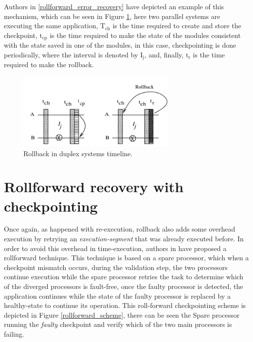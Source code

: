 \documentclass[10pt, a4paper]{report}
\begin{document}
Authors in \ref{rollforward_error_recovery} have depicted an example of this 
mechanism, which can be seen in Figure \ref{rollback_diagram}, here two parallel 
systems are executing the same application, $\mathrm{T_{ch}}$ is the time 
required to create and store the checkpoint, $\mathrm{t_{cp}}$ is the time 
required to make the state of the modules consistent with the state saved in one 
of the modules, in this case, checkpointing is done periodically, where the 
interval is denoted by $\mathrm{I_j}$, and, finally, $\mathrm{t_r}$ is the time 
required to make the rollback.

\begin{figure}[h!]
    \begin{center}
        \includegraphics[width=0.7\textwidth]{rollback_diagram.png}
        \caption{Rollback in duplex systems timeline.}
        \label{rollback_diagram}
    \end{center}
\end{figure}

\section{Rollforward recovery with checkpointing}

Once again, as happened with re-execution, rollback also adds some overhead
execution by retrying an \emph{execution-segment} that was already executed
before. In order to avoid this overhead in time-execution, authors in
\cite{rollforward_error_recovery} have proposed a rollforward technique. This
technique is based on a spare processor, which when a checkpoint mismatch
occurs, during the validation step, the two processors continue execution while
the spare processor retries the task to determine which of the diverged
processors is fault-free, once the faulty processor is detected, the application
continues while the state of the faulty processor is replaced by a healthy-state
to continue its operation. This roll-forward checkpointing scheme is depicted in
Figure \ref{rollforward_scheme}, there can be seen the Spare processor running
the \emph{faulty} checkpoint and verify which of the two main processors is
failing.
\end{document}
